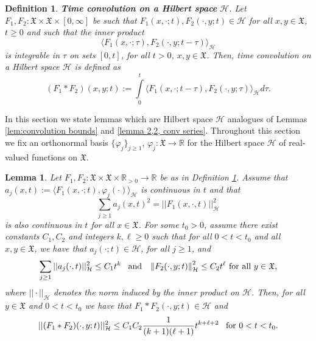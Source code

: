 \documentclass[11pt,reqno]{amsart}
\newtheorem{lemma}[theorem]{Lemma}
\newtheorem{definition}[theorem]{Definition}
\theoremstyle{remark}
\theoremstyle{definition}
\newtheorem{remark}{Remark}
\numberwithin{theorem}{section} \numberwithin{equation}{section}
\newcommand{\X}{\mathfrak{X}}
\begin{document}
\begin{definition} \label{def. convHilb}\textbf{Time convolution on a Hilbert space} $\mathcal{H}$. Let $F_1,F_2: \X\times\X\times[0,\infty]$ be such that $F_1(x,\cdot;t), F_2(\cdot,y;t)\in \mathcal{H}$ for all $x,y\in\X$, $t\geq 0$ and such that the inner product
$$
\langle F_1(x,\cdot;\tau), F_2(\cdot,y;t-\tau) \rangle_{\mathcal{H}}
$$
is  integrable in $\tau$ on sets $[0, t]$, for all $t>0$, $x,y\in\X$. Then, time convolution on a Hilbert space $\mathcal{H}$ is defined as
\begin{equation}\label{eq. defn conv F1,2 Hilbert}
(F_1\ast F_2)(x,y;t):=\int\limits_{0}^t\langle F_1(x,\cdot;t-\tau),F_2(\cdot,y;\tau)\rangle_{\mathcal{H}} d\tau.
\end{equation}
\end{definition}


In this section we state lemmas which are Hilbert space $\mathcal{H}$ analogues of Lemmas \ref{lem:convolution bounds} and \ref{lemma 2,2, conv series}. Throughout this section we fix an orthonormal basis $\{\varphi_j\}_{j\geq 1}$, $\varphi_j:\X\to\mathbb{R}$
for the Hilbert space $\mathcal{H}$ of real-valued functions on $\X$.

\begin{lemma}
\label{lem:convolution bounds Hilb} Let $F_{1},F_{2}:\X\times \X\times\mathbb{R}_{>0}\to\mathbb{R}$
be as in Definition \ref{def. convHilb}.  Assume that $a_j(x,t):= \langle F_1(x,\cdot; t), \varphi_j(\cdot) \rangle_{\mathcal{H}}$ is
continuous in $t$ and that
$$
\sum_{j\geq 1}a_j(x,t)^2 =||F_1(x,\cdot,t)||_{\mathcal{H}}^2
$$
is also continuous in $t$ for all $x\in\X$. For some $t_{0} > 0$, assume there exist constants $C_1, C_2$ and integers $k,\ell\geq 0$
such that for all $0<t<t_{0}$ and all $x,y \in \X$, we have that $a_j(\cdot ;t)\in\mathcal{H}$, for all $j\geq 1$,  and
$$
\sum_{j\geq 1} ||a_j(\cdot,t)||^2_{\mathcal{H}}\leq C_{1}t^{k}
  \,\,\,\,\,
  \text{\rm and}
  \,\,\,\,\,
  \left\|F_{2}(\cdot, y;t)\right\|_{\mathcal{H}}^2\leq C_{2}t^{\ell} \,\, \text{\rm for all $y\in\X$,}
$$
where $||\cdot||_{\mathcal{H}}$ denotes the norm induced by the inner product on $\mathcal{H}$. Then, for all $y\in \X$ and $0<t<t_{0}$
we have that $F_1\ast F_2(\cdot,y; t)\in\mathcal{H}$ and
\[
||(F_{1}\ast F_{2})(\cdot,y;t)||_{\mathcal{H}}^2 \leq C_{1}C_{2}\frac{1}{(k+1)(\ell+1)}
  t^{k+\ell+2}
  \,\,\,\,\,
  \text{\rm for $0<t<t_{0}$.}
\]
\end{lemma}
\end{document}
